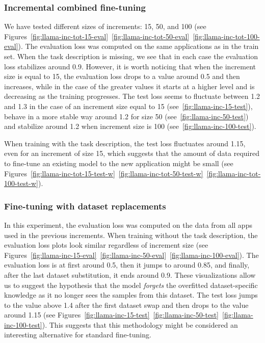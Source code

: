 \documentclass[licencjacka,en]{pracamgr}
\begin{document}
\subsubsection{Incremental combined fine-tuning}

We have tested different sizes of increments: 15, 50, and 100 (see Figures~\ref{fig:llama-inc-tot-15-eval}~\ref{fig:llama-inc-tot-50-eval}~\ref{fig:llama-inc-tot-100-eval}). The evaluation loss was computed on the same applications as in the train set. When the task description is missing, we see that in each case the evaluation loss stabilizes around 0.9. However, it is worth noticing that when the increment size is equal to 15, the evaluation loss drops to a value around 0.5 and then increases, while in the case of the greater values it starts at a higher level and is decreasing as the training progresses. The test loss seems to fluctuate between 1.2 and 1.3 in the case of an increment size equal to 15 (see~\ref{fig:llama-inc-15-test}), behave in a more stable way around 1.2 for size 50 (see~\ref{fig:llama-inc-50-test}) and stabilize around 1.2 when increment size is 100 (see~\ref{fig:llama-inc-100-test}).

When training with the task description, the test loss fluctuates around 1.15, even for an increment of size 15, which suggests that the amount of data required to fine-tune an existing model to the new application might be small (see Figures~\ref{fig:llama-inc-tot-15-test-w}~\ref{fig:llama-inc-tot-50-test-w}~\ref{fig:llama-inc-tot-100-test-w}).

\subsubsection{Fine-tuning with dataset replacements}

In this experiment, the evaluation loss was computed on the data from all apps used in the previous increments.
When training without the task description, the evaluation loss plots look similar regardless of increment size (see Figures~\ref{fig:llama-inc-15-eval}~\ref{fig:llama-inc-50-eval}~\ref{fig:llama-inc-100-eval}). The evaluation loss is at first around 0.5, then it jumps to around 0.85, and finally, after the last dataset substitution, it ends around 0.9. These visualizations allow us to suggest the hypothesis that the model \emph{forgets} the overfitted dataset-specific knowledge as it no longer sees the samples from this dataset. The test loss jumps to the value above 1.4 after the first dataset swap and then drops to the value around 1.15 (see Figures~\ref{fig:llama-inc-15-test}~\ref{fig:llama-inc-50-test}~\ref{fig:llama-inc-100-test}). This suggests that this methodology might be considered an interesting alternative for standard fine-tuning.
\end{document}
